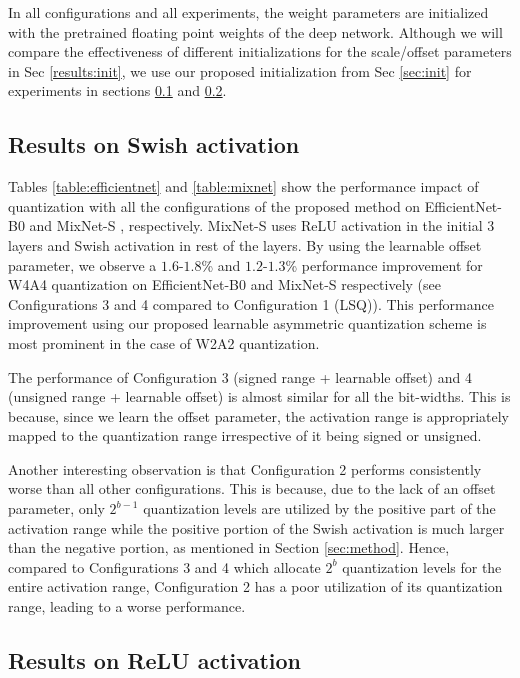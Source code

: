 \documentclass[10pt,twocolumn,letterpaper]{article}
\begin{document}
In all configurations and all experiments, the weight parameters are initialized with the pretrained floating point weights of the deep network. Although we will compare the effectiveness of different initializations for the scale/offset parameters in Sec \ref{results:init}, we use our proposed initialization from Sec \ref{sec:init}  for experiments in sections \ref{results:swish} and \ref{results:relu}.

\subsection{Results on Swish activation}
\label{results:swish}
Tables \ref{table:efficientnet} and \ref{table:mixnet} show the performance impact of quantization with all the configurations of the proposed method on EfficientNet-B0 \cite{efficientnet} and MixNet-S \cite{mixnet}, respectively. MixNet-S uses ReLU activation in the initial 3 layers and Swish activation in rest of the layers. By using the learnable offset parameter, we observe a $1.6$-$1.8$\% and $1.2$-$1.3$\% performance improvement for W4A4 quantization on EfficientNet-B0 and MixNet-S respectively (see Configurations 3 and 4 compared to Configuration 1 (LSQ)). This performance improvement using our proposed learnable asymmetric quantization scheme is most prominent in the case of W2A2 quantization.

The performance of Configuration 3 (signed range + learnable offset) and 4 (unsigned range + learnable offset) is almost similar for all the bit-widths. This is because, since we learn the offset parameter, the activation range is appropriately mapped to the quantization range irrespective of it being signed or unsigned.

Another interesting observation is that Configuration 2 performs consistently worse than all other configurations. This is because, due to the lack of an offset parameter, only $2^{b-1}$ quantization levels are utilized by the positive part of the activation range while the positive portion of the Swish activation is much larger than the negative portion, as mentioned in Section \ref{sec:method}. Hence, compared to Configurations 3 and 4 which allocate $2^b$ quantization levels for the entire activation range, Configuration 2 has a poor utilization of its quantization range, leading to a worse performance.


\subsection{Results on ReLU activation}
\label{results:relu}
\end{document}
